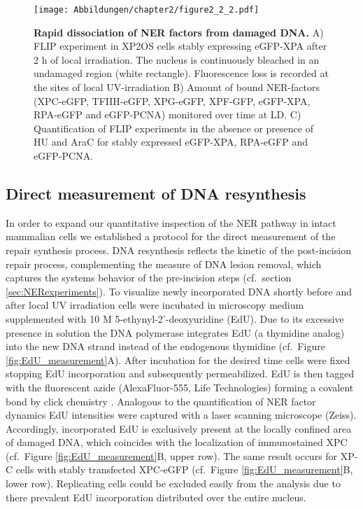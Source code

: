   \begin{figure}[htbp]
  	\begin{center}
  		\texttt{[image: Abbildungen/chapter2/figure2\_2\_2.pdf]}
  		\caption{\textbf{Rapid dissociation of NER factors from damaged DNA.} A) FLIP experiment in XP2OS cells stably expressing eGFP-XPA after 2 h of local irradiation. The nucleus is continuously bleached in an undamaged region (white rectangle). Fluorescence loss is recorded at the sites of local UV-irradiation B) Amount of bound NER-factors (XPC-eGFP, TFIIH-eGFP, XPG-eGFP, XPF-GFP, eGFP-XPA, RPA-eGFP and eGFP-PCNA) monitored over time at LD. C) Quantification of FLIP experiments in the absence or presence of HU and AraC for stably expressed eGFP-XPA, RPA-eGFP and eGFP-PCNA.}
  		\label{fig:accuFlip}
  	\end{center}
  \end{figure}



\subsection{Direct measurement of DNA resynthesis}
\label{Subsec:EdUmeasurement}

In order to expand our quantitative inspection of the NER pathway in intact mammalian cells we established a protocol for the direct measurement of the repair synthesis process. DNA resynthesis reflects the kinetic of the post-incision repair process, complementing the measure of DNA lesion removal, which captures the systems behavior of the pre-incision steps (cf.\ section \ref{sec:NERexperiments}). To visualize newly incorporated DNA shortly before and after local UV irradiation cells were incubated in microscopy medium supplemented with 10 \textmu M 5-ethynyl-2'-deoxyuridine (EdU). Due to its excessive presence in solution the DNA polymerase integrates EdU (a thymidine analog) into the new DNA strand instead of the endogenous thymidine (cf.\ Figure \ref{fig:EdU_measurement}A). After incubation for the desired time cells were fixed stopping EdU incorporation and subsequently permeabilized. EdU is then tagged with the fluorescent azide (AlexaFluor-555, Life Technologies) forming a covalent bond by click chemistry \cite{Limsirichaikul2009}. Analogous to the quantification of NER factor dynamics EdU intensities were captured with a laser scanning microscope (Zeiss).\\
Accordingly, incorporated EdU is exclusively present at the locally confined area of  damaged DNA, which coincides with the localization of immunostained XPC (cf.\ Figure \ref{fig:EdU_measurement}B, upper row). The same result occurs for XP-C cells with stably transfected XPC-eGFP (cf.\ Figure \ref{fig:EdU_measurement}B, lower row). Replicating cells could be excluded easily from the analysis due to there prevalent EdU incorporation distributed over the entire nucleus. 
  

